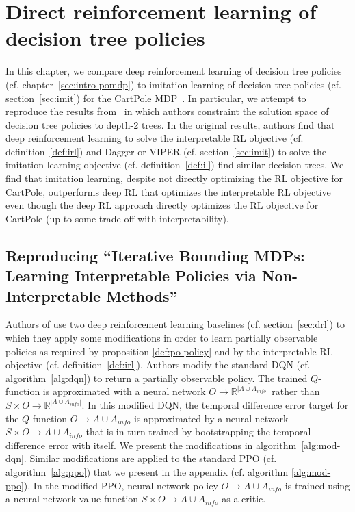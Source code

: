 \chapter{Direct reinforcement learning of decision tree policies}\label{sec:topin}
In this chapter, we compare deep reinforcement learning of decision tree policies (cf. chapter~\ref{sec:intro-pomdp}) to imitation learning of decision tree policies (cf. section~\ref{sec:imit}) for the CartPole MDP~\cite{cartpole}.
In particular, we attempt to reproduce the results from~\cite[table 1]{topin2021iterative} in which authors constraint the solution space of decision tree policies to depth-2 trees.
In the original results, authors find that deep reinforcement learning to solve the interpretable RL objective (cf. definition~\ref{def:irl}) and Dagger or VIPER (cf. section~\ref{sec:imit}) to solve the imitation learning objective (cf. definition~\ref{def:il}) find similar decision trees.
We find that imitation learning, despite not directly optimizing the RL objective for CartPole, outperforms deep RL that optimizes the interpretable RL objective even though the deep RL approach directly optimizes the RL objective for CartPole (up to some trade-off with interpretability).
\section{Reproducing ``Iterative Bounding MDPs: Learning Interpretable Policies via Non-Interpretable Methods''}

Authors of \cite{topin2021iterative} use two deep reinforcement learning baselines (cf. section~\ref{sec:drl}) to which they apply some modifications in order to learn partially observable policies as required by proposition \ref{def:po-policy} and by the interpretable RL objective (cf. definition~\ref{def:irl}).
Authors modify the standard DQN (cf. algorithm~\ref{alg:dqn}) to return a partially observable policy. The trained $Q$-function is approximated with a neural network $O\rightarrow \mathbb{R}^{|A\cup A_{info}|}$ rather than $S\times O\rightarrow \mathbb{R}^{|A\cup A_{info}|}$.
In this modified DQN, the temporal difference error target for the $Q$-function $O\rightarrow A\cup A_{info}$ is approximated by a neural network $S\times O\rightarrow A\cup A_{info}$ that is in turn trained by bootstrapping the temporal difference error with itself.
We present the modifications in algorithm~\ref{alg:mod-dqn}.
Similar modifications are applied to the standard PPO (cf. algorithm~\ref{alg:ppo}) that we present in the appendix (cf. algorithm \ref{alg:mod-ppo}). In the modified PPO, neural network policy $O\rightarrow A\cup A_{info}$ is trained using a neural network value function $S\times O\rightarrow A\cup A_{info}$ as a critic.

